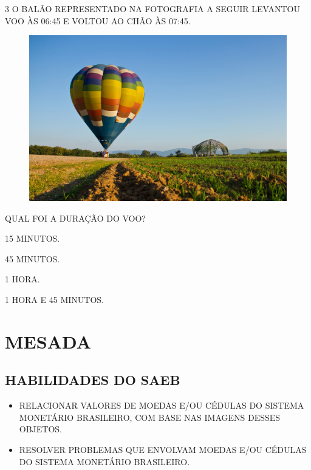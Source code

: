 \num{3} O BALÃO REPRESENTADO NA FOTOGRAFIA A SEGUIR LEVANTOU 
VOO ÀS 06:45 E VOLTOU AO CHÃO ÀS 07:45.

\begin{figure}[H]
\centering
\includegraphics[width=.9\textwidth]{./media/image114.jpg}
\end{figure}

QUAL FOI A DURAÇÃO DO VOO?

\begin{escolha}
\item 15 MINUTOS.

\item 45 MINUTOS.

\item 1 HORA.

\item 1 HORA E 45 MINUTOS.
\end{escolha}


\chapter{MESADA}

\section*{HABILIDADES DO SAEB}

\begin{itemize}
\item \uppercase{Relacionar valores de moedas e/ou cédulas do sistema monetário
brasileiro, com base nas imagens desses objetos.}

\item \uppercase{Resolver problemas que envolvam moedas e/ou cédulas do sistema
monetário brasileiro.}
\end{itemize}

